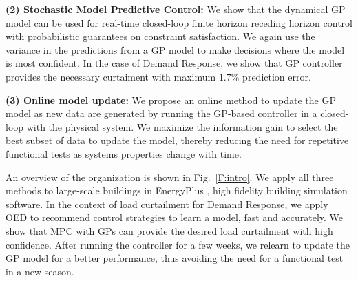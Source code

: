 \noindent \textbf{(2) Stochastic Model Predictive Control:} We show that the dynamical GP model can be used for real-time closed-loop finite horizon receding horizon control with probabilistic guarantees on constraint satisfaction. We again use the variance in the predictions from a GP model to make decisions where the model is most confident. In the case of Demand Response, we show that GP controller provides the necessary curtaiment with maximum \(1.7\% \) prediction error.
	
\noindent \textbf{(3) Online model update:} We propose an online method to update the GP model as new data are generated by running the GP-based controller in a closed-loop with the physical system. We maximize the information gain to select the best subset of data to update the model, thereby reducing the need for repetitive functional tests as systems properties change with time.

An overview of the organization is shown in Fig.~\ref{F:intro}.
We apply all three methods to large-scale buildings in EnergyPlus \cite{Deru2011}, high fidelity building simulation software.
In the context of load curtailment for Demand Response, we apply OED to recommend control strategies to learn a model, fast and accurately. We show that MPC with GPs can provide the desired load curtailment with high confidence. After running the controller for a few weeks, we relearn to update the GP model for a better performance, thus avoiding the need for a functional test in a new season.



